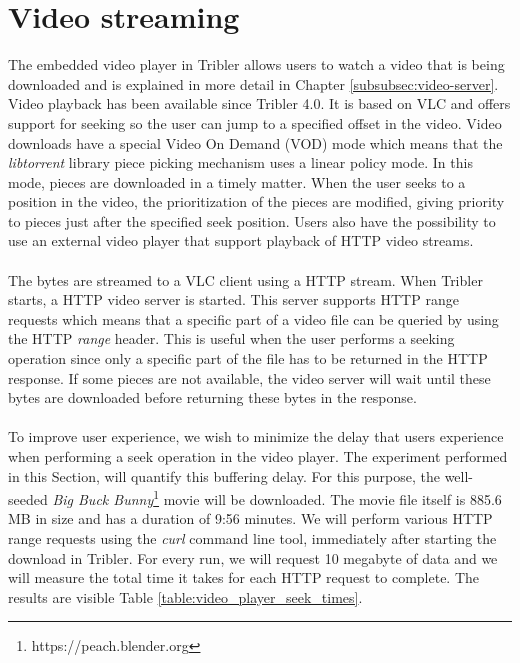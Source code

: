\section{Video streaming}
The embedded video player in Tribler allows users to watch a video that is being downloaded and is explained in more detail in Chapter \ref{subsubsec:video-server}. Video playback has been available since Tribler 4.0. It is based on VLC and offers support for seeking so the user can jump to a specified offset in the video. Video downloads have a special Video On Demand (VOD) mode which means that the \emph{libtorrent} library piece picking mechanism uses a linear policy mode. In this mode, pieces are downloaded in a timely matter. When the user seeks to a position in the video, the prioritization of the pieces are modified, giving priority to pieces just after the specified seek position. Users also have the possibility to use an external video player that support playback of HTTP video streams.\\\\
The bytes are streamed to a VLC client using a HTTP stream. When Tribler starts, a HTTP video server is started. This server supports HTTP range requests which means that a specific part of a video file can be queried by using the HTTP \emph{range} header. This is useful when the user performs a seeking operation since only a specific part of the file has to be returned in the HTTP response. If some pieces are not available, the video server will wait until these bytes are downloaded before returning these bytes in the response.\\\\
To improve user experience, we wish to minimize the delay that users experience when performing a seek operation in the video player. The experiment performed in this Section, will quantify this buffering delay. For this purpose, the well-seeded \emph{Big Buck Bunny}\footnote{https://peach.blender.org} movie will be downloaded. The movie file itself is 885.6 MB in size and has a duration of 9:56 minutes. We will perform various HTTP range requests using the \emph{curl} command line tool, immediately after starting the download in Tribler. For every run, we will request 10 megabyte of data and we will measure the total time it takes for each HTTP request to complete. The results are visible Table \ref{table:video_player_seek_times}.\\

